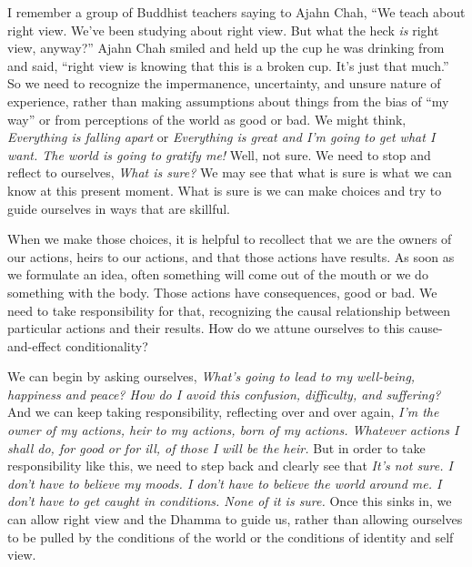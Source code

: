 I remember a group of Buddhist teachers saying to Ajahn Chah, ``We 
teach about right view. We've been studying about right view. But what 
the heck \emph{is} right view, anyway?'' Ajahn Chah smiled and held up 
the cup he was drinking from and said, ``right view is knowing that 
this is a broken cup. It's just that much.'' So we need to recognize 
the impermanence, uncertainty, and unsure nature of experience, rather 
than making assumptions about things from the bias of ``my way'' or 
from perceptions of the world as good or bad. We might think, 
\emph{Everything is falling apart} or \emph{Everything is great and I'm 
going to get what I want. The world is going to gratify me!} Well, not 
sure. We need to stop and reflect to ourselves, \emph{What is sure?} We 
may see that what is sure is what we can know at this present moment. 
What is sure is we can make choices and try to guide ourselves in ways 
that are skillful.

When we make those choices, it is helpful to recollect that we are the 
owners of our actions, heirs to our actions, and that those actions 
have results. As soon as we formulate an idea, often something will 
come out of the mouth or we do something with the body. Those actions 
have consequences, good or bad. We need to take responsibility for 
that, recognizing the causal relationship between particular actions 
and their results. How do we attune ourselves to this cause-and-effect 
conditionality?

We can begin by asking ourselves, \emph{What's going to lead to my 
well-being, happiness and peace? How do I avoid this confusion, 
difficulty, and suffering?} And we can keep taking responsibility, 
reflecting over and over again, \emph{I'm the owner of my actions, heir 
to my actions, born of my actions. Whatever actions I shall do, for 
good or for ill, of those I will be the heir.} But in order to take 
responsibility like this, we need to step back and clearly see that 
\emph{It's not sure. I don't have to believe my moods. I don't have to 
believe the world around me. I don't have to get caught in conditions. 
None of it is sure.} Once this sinks in, we can allow right view and 
the Dhamma to guide us, rather than allowing ourselves to be pulled by 
the conditions of the world or the conditions of identity and self view.


